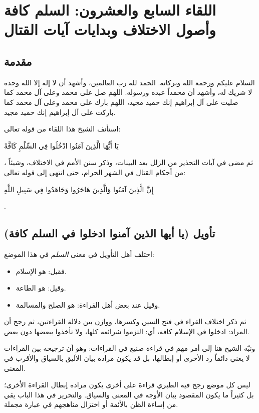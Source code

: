 \chapter{اللقاء السابع والعشرون: السلم كافة وأصول الاختلاف وبدايات آيات القتال}

\section{مقدمة}
السلام عليكم ورحمة الله وبركاته. الحمد لله رب العالمين، وأشهد أن لا إله إلا الله وحده لا شريك له، وأشهد أن محمداً عبده ورسوله. اللهم صل على محمد وعلى آل محمد كما صليت على آل إبراهيم إنك حميد مجيد، اللهم بارك على محمد وعلى آل محمد كما باركت على آل إبراهيم إنك حميد مجيد.

استأنف الشيخ هذا اللقاء من قوله تعالى: \begin{ayah}يَا أَيُّهَا الَّذِينَ آمَنُوا ادْخُلُوا فِي السِّلْمِ كَافَّةً\end{ayah}، ثم مضى في آيات التحذير من الزلل بعد البينات، وذكر سنن الأمم في الاختلاف، وشيئاً من أحكام القتال في الشهر الحرام، حتى انتهى إلى قوله تعالى: \begin{ayah}إِنَّ الَّذِينَ آمَنُوا وَالَّذِينَ هَاجَرُوا وَجَاهَدُوا فِي سَبِيلِ اللَّهِ\end{ayah}.

\separator

\section{تأويل (يا أيها الذين آمنوا ادخلوا في السلم كافة)}
 اختلف أهل التأويل في معنى \textit{السلم} في هذا الموضع:
\begin{itemize}
    \item فقيل: هو الإسلام.
    \item وقيل: هو الطاعة.
    \item وقيل عند بعض أهل القراءة: هو الصلح والمسالمة.
\end{itemize}

ثم ذكر  اختلاف القراء في فتح السين وكسرها، ووازن بين دلالة القراءتين، ثم رجح أن المراد: ادخلوا في الإسلام كافة، أي: التزموا شرائعه كلها، ولا تأخذوا ببعضها دون بعض.

ونبّه الشيخ هنا إلى أمر مهم في قراءة صنيع  في القراءات: وهو أن ترجيحه بين القراءات لا يعني دائماً رد الأخرى أو إبطالها، بل قد يكون مراده بيان الأليق بالسياق والأقرب في المعنى.

\begin{fawaid}
ليس كل موضع رجح فيه الطبري قراءة على أخرى يكون مراده إبطال القراءة الأخرى؛ بل كثيراً ما يكون المقصود بيان الأوجه في المعنى والسياق. والتحرير في هذا الباب يقي من إساءة الظن بالأئمة أو اختزال مناهجهم في عبارة مجملة.
\end{fawaid}

